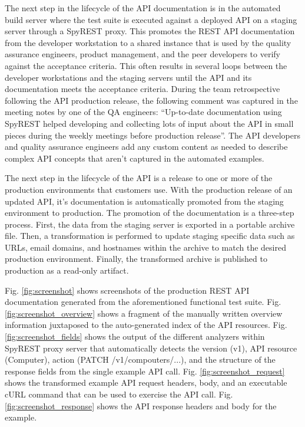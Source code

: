 \documentclass[10pt, conference]{IEEEtran}
\begin{document}
The next step in the lifecycle of the API documentation is in the automated build server where the test suite is executed against a deployed API on a staging server through a SpyREST proxy. This promotes the REST API documentation from the developer workstation to a shared instance that is used by the quality assurance engineers, product management, and the peer developers to verify against the acceptance criteria. This often results in several loops between the developer workstations and the staging servers until the API and its documentation meets the acceptance criteria. During the team retrospective following the API production release, the following comment was captured in the meeting notes by one of the QA engineers: ``Up-to-date documentation using SpyREST helped developing and collecting lots of input about the API in small pieces during the weekly meetings before production release''. The API developers and quality assurance engineers add any custom content as needed to describe complex API concepts that aren't captured in the automated examples.

The next step in the lifecycle of the API is a release to one or more of the production environments that customers use. With the production release of an updated API, it's documentation is automatically promoted from the staging environment to production. The promotion of the documentation is a three-step process. First, the data from the staging server is exported in a portable archive file. Then, a transformation is performed to update staging specific data such as URLs, email domains, and hostnames within the archive to match the desired production environment. Finally, the transformed archive is published to production as a read-only artifact.

Fig. \ref{fig:screenshot} shows screenshots of the production REST API documentation generated from the aforementioned functional test suite. Fig. \ref{fig:screenshot_overview} shows a fragment of the manually written overview information juxtaposed to the auto-generated index of the API resources. Fig. \ref{fig:screenshot_fields} shows the output of the different analyzers within SpyREST proxy server that automatically detects the version (v1), API resource (Computer), action (PATCH /v1/compouters/...), and the structure of the response fields from the single example API call. Fig. \ref{fig:screenshot_request} shows the transformed example API request headers, body, and an executable cURL command that can be used to exercise the API call. Fig. \ref{fig:screenshot_response} shows the API response headers and body for the example.
\end{document}
